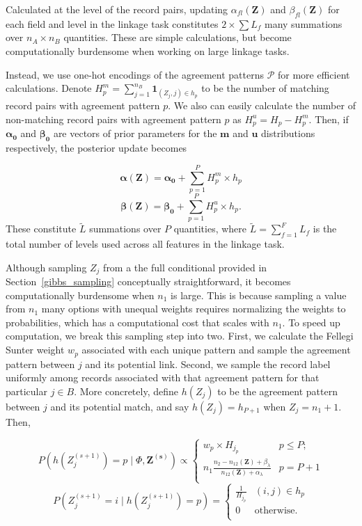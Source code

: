 \documentclass[ba]{imsart}
\begin{document}
Calculated at the level of the record pairs, updating  \(\alpha_{fl}(\bm{Z})\) and \(\beta_{fl}(\bm{Z})\) for each field and level in the linkage task constitutes \(2 \times \sum L_f\) many summations over \(n_A \times n_B\) quantities. These are simple calculations, but become computationally burdensome when working on large linkage tasks. 

Instead, we use one-hot encodings of the agreement patterns $\mathcal{P}$ for more efficient calculations. Denote
$H_p^m = \sum_{j=1}^{n_B} \bm{1}_{(Z_j, j) \in h_p}$ to be the
number of matching record pairs with agreement pattern $p$. We also can easily calculate the number of non-matching record pairs with agreement pattern $p$ as \(H_p^u = H_p - H_p^m\). Then, if $\bm{\alpha_0}$ and $\bm{\beta_0}$ are vectors of prior parameters for the $\bm{m}$ and $\bm{u}$ distributions respectively, the posterior update becomes

$$\bm{\alpha(Z)} = \bm{\alpha_0} + \sum_{p=1}^P H_p^m \times h_p$$
$$\bm{\beta(Z)} = \bm{\beta_0} + \sum_{p=1}^P H_p^u \times h_p.$$
These constitute $\tilde{L}$ summations over $P$ quantities, where $\tilde{L} = \sum_{f=1}^F L_f$ is the total number of levels used across all features in the linkage task.

Although sampling \(Z_j\) from a the full conditional provided in Section~\ref{gibbs_sampling} conceptually straightforward, it becomes computationally burdensome when $n_1$ is large. This is because sampling a value from $n_1$ many options with unequal weights requires normalizing the weights to probabilities, which has a computational cost that scales with $n_1$. To speed up computation, we break this sampling step into two. First, we calculate the Fellegi Sunter weight \(w_{p}\) associated with each unique pattern and sample the agreement pattern between \(j\) and its potential link. Second, we sample the record label uniformly among records associated with that agreement pattern for that particular \(j\in B\). More concretely, define \(h(Z_j)\) to be the agreement pattern between \(j\) and its potential match, and say \(h(Z_j) = h_{P+1}\) when \(Z_j = n_1 + 1\). Then,

$$P\left(h\left(Z_j^{(s+1)}\right) = p \mid \Phi, \bm{Z^{(s)}}\right) \propto
\begin{cases} 
	w_{p}\times H_{j_p}  & p \leq P; \\
	n_1 \frac{n_2 - n_{12}(\bm{Z}) + \beta_{\lambda}}{n_{12}(\bm{Z}) + \alpha_{\lambda}} &   p = P + 1 \\
\end{cases}$$
$$P\left(Z_j^{(s+1)} = i \mid h\left(Z_j^{(s+1)}\right) = p\right) = \begin{cases} 
	\frac{1}{H_{j_p}} & (i, j) \in h_p \\
	0 & \text{otherwise.} \\
\end{cases}$$
\end{document}
